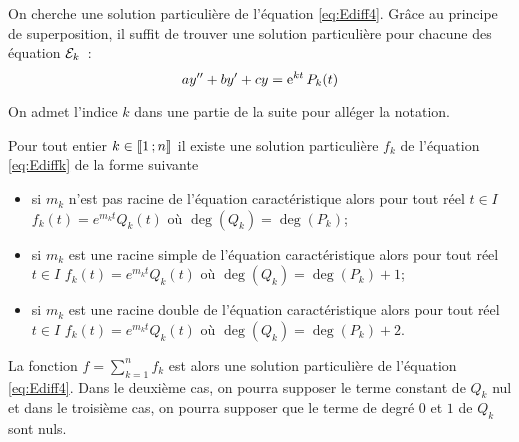On cherche une solution particulière de l'équation \eqref{eq:Ediff4}. Grâce au 
principe de superposition, il suffit de trouver une solution particulière pour 
chacune des équation \(\mathcal{E}_k\)~:
\begin{equation}
  \label{eq:Ediffk}
  ay'' + by' + cy= \operatorname{e}^{kt} P_k(t)
\end{equation}

On admet l'indice \(k\) dans une partie de la suite pour alléger la notation.

\begin{theo}
    Pour tout entier \(k \in \mathopen{\llbracket}1\mathclose{}\mathpunct{};n\mathclose{\rrbracket}\) il existe une solution 
    particulière \(f_k\) de l'équation \eqref{eq:Ediffk} de la forme suivante
    \begin{itemize}
        \item si \(m_k\) n'est pas racine de l'équation caractéristique alors 
            pour tout réel \(t \in I\) \(f_k(t) = e^{m_k t} Q_k(t)\) où 
            \(\deg(Q_k) = \deg(P_k)\);
        \item si \(m_k\) est une racine simple de l'équation caractéristique 
            alors pour tout réel \(t \in I\) \(f_k(t) = e^{m_k t} Q_k(t)\) où 
            \(\deg(Q_k) = \deg(P_k) + 1\);
        \item si \(m_k\) est une racine double de l'équation caractéristique 
            alors pour tout réel \(t \in I\) \(f_k(t) = e^{m_k t} Q_k(t)\) où 
            \(\deg(Q_k) = \deg(P_k) + 2\).
    \end{itemize}
    La fonction \(f = \sum_{k = 1}^{n} f_k\) est alors une solution particulière 
    de l'équation \eqref{eq:Ediff4}. Dans le deuxième cas, on pourra supposer le 
    terme constant de \(Q_k\) nul et dans le troisième cas, on pourra supposer 
    que le terme de degré \(0\) et \(1\) de \(Q_k\) sont nuls.
\end{theo}

